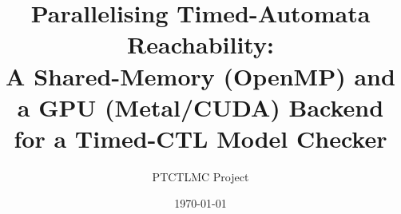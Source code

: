\title{\bfseries Parallelising Timed-Automata Reachability:\\[2pt]
  \large A Shared-Memory (OpenMP) and a GPU (Metal/CUDA) Backend for a Timed-CTL Model Checker}
\author{PTCTLMC Project}
\date{\today}


\usepackage{multirow}
\usetikzlibrary{patterns}


\providecommand{\clockSet}{\mathcal{C}}
\providecommand{\Zone}{\mathcal{Z}}
\providecommand{\DBM}[1]{\mathbf{D}_{#1}}
\providecommand{\Passed}{\mathit{Passed}}
\providecommand{\dk}{\mathit{dk}}
\providecommand{\aLU}{\ensuremath{\preceq_{\mathit{LU}}}}
\providecommand{\tool}{\textsc{Ptctlmc}}
\providecommand{\uppaal}{\textsc{Uppaal}}
\providecommand{\ltsmin}{\textsc{LTSmin}}
\providecommand{\opaal}{\textsc{opaal}}
